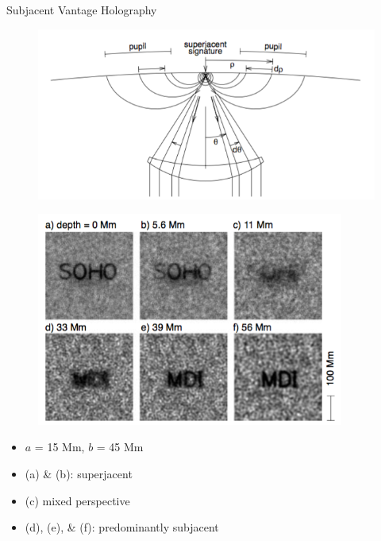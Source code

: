 \documentclass{beamer}
\begin{document}
\begin{frame}{Subjacent Vantage Holography}
    \begin{figure}
        \includegraphics[width=\textwidth]{fig_4.png}
    \end{figure}
\end{frame}
\begin{frame}
    \begin{figure}
        \includegraphics[width=0.9\textwidth]{fig_3.png}
    \end{figure}
    \vspace{-0.25cm}
    \begin{itemize}
        \item $a$ = 15 Mm, $b$ = 45 Mm
        \item (a) \& (b): superjacent
        \item (c) mixed perspective
        \item (d), (e), \& (f): predominantly subjacent
    \end{itemize}
\end{frame}
\end{document}

